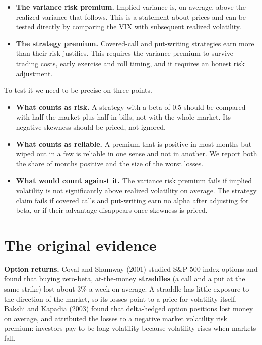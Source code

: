 \begin{itemize}
  \item \textbf{The variance risk premium.} Implied variance is, on average, above the realized variance that follows. This is a statement about prices and can be tested directly by comparing the VIX with subsequent realized volatility.
  \item \textbf{The strategy premium.} Covered-call and put-writing strategies earn more than their risk justifies. This requires the variance premium to survive trading costs, early exercise and roll timing, and it requires an honest risk adjustment.
\end{itemize}

To test it we need to be precise on three points.

\begin{itemize}
  \item \textbf{What counts as risk.} A strategy with a beta of 0.5 should be compared with half the market plus half in bills, not with the whole market. Its negative skewness should be priced, not ignored.
  \item \textbf{What counts as reliable.} A premium that is positive in most months but wiped out in a few is reliable in one sense and not in another. We report both the share of months positive and the size of the worst losses.
  \item \textbf{What would count against it.} The variance risk premium fails if implied volatility is not significantly above realized volatility on average. The strategy claim fails if covered calls and put-writing earn no alpha after adjusting for beta, or if their advantage disappears once skewness is priced.
\end{itemize}

\section{The original evidence}
\label{sec:16-evidence}

\textbf{Option returns.} Coval and Shumway (2001) studied S\&P 500 index options and found that buying zero-beta, at-the-money \textbf{straddles} (a call and a put at the same strike) lost about 3\% a week on average. A straddle has little exposure to the direction of the market, so its losses point to a price for volatility itself. Bakshi and Kapadia (2003) found that delta-hedged option positions lost money on average, and attributed the losses to a negative market volatility risk premium: investors pay to be long volatility because volatility rises when markets fall.

